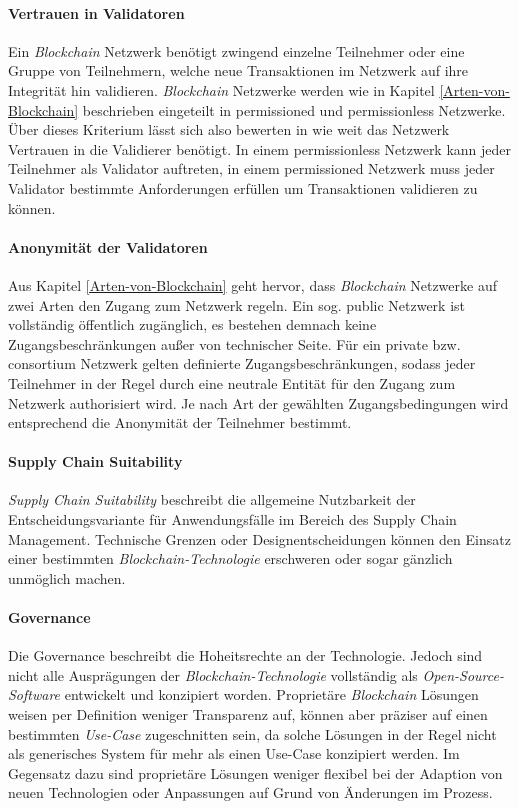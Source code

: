 \paragraph{Vertrauen in Validatoren}
Ein \textit{Blockchain} Netzwerk benötigt zwingend einzelne Teilnehmer oder eine Gruppe von Teilnehmern, welche neue Transaktionen im Netzwerk auf ihre Integrität hin validieren. \textit{Blockchain} Netzwerke werden wie in Kapitel \ref{Arten-von-Blockchain} beschrieben eingeteilt in permissioned und permissionless Netzwerke. Über dieses Kriterium lässt sich also bewerten in wie weit das Netzwerk Vertrauen in die Validierer benötigt. In einem permissionless Netzwerk kann jeder Teilnehmer als Validator auftreten, in einem permissioned Netzwerk muss jeder Validator bestimmte Anforderungen erfüllen um Transaktionen validieren zu können.

\paragraph{Anonymität der Validatoren}
Aus Kapitel \ref{Arten-von-Blockchain} geht hervor, dass \textit{Blockchain} Netzwerke auf zwei Arten den Zugang zum Netzwerk regeln. Ein sog. public Netzwerk ist vollständig öffentlich zugänglich, es bestehen demnach keine Zugangsbeschränkungen außer von technischer Seite. Für ein private bzw. consortium Netzwerk gelten definierte Zugangsbeschränkungen, sodass jeder Teilnehmer in der Regel durch eine neutrale Entität für den Zugang zum Netzwerk authorisiert wird. Je nach Art der gewählten Zugangsbedingungen wird entsprechend die Anonymität der Teilnehmer bestimmt.

\paragraph{Supply Chain Suitability}
\textit{Supply Chain Suitability} beschreibt die allgemeine Nutzbarkeit der Entscheidungsvariante für Anwendungsfälle im Bereich des Supply Chain Management. Technische Grenzen oder Designentscheidungen können den Einsatz einer bestimmten \textit{Blockchain-Technologie} erschweren oder sogar gänzlich unmöglich machen.

\paragraph{Governance}
Die Governance beschreibt die Hoheitsrechte an der Technologie. Jedoch sind nicht alle Ausprägungen der \textit{Blockchain-Technologie} vollständig als \textit{Open-Source-Software} entwickelt und konzipiert worden. Proprietäre \textit{Blockchain} Lösungen weisen per Definition weniger Transparenz auf, können aber präziser auf einen bestimmten \textit{Use-Case} zugeschnitten sein, da solche Lösungen in der Regel nicht als generisches System für mehr als einen Use-Case konzipiert werden. Im Gegensatz dazu sind proprietäre Lösungen weniger flexibel bei der Adaption von neuen Technologien oder Anpassungen auf Grund von Änderungen im Prozess.\\

